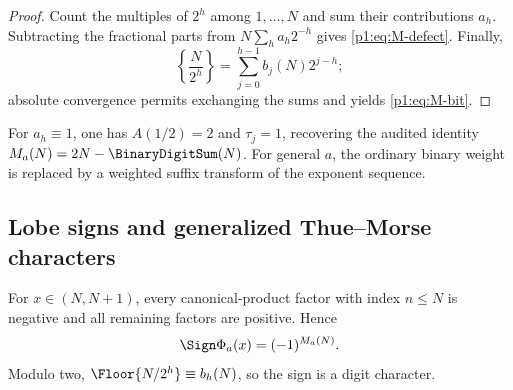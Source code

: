 \documentclass[11pt,oneside]{article}
\numberwithin{equation}{section}
\theoremstyle{definition}
\theoremstyle{remark}
\begin{document}
\begin{proof}
Count the multiples of $2^h$ among $1,\ldots,N$ and sum their contributions $a_h$.
Subtracting the fractional parts from $N\sum_ha_h2^{-h}$ gives \eqref{p1:eq:M-defect}.
Finally,
\[
 \left\{\frac{N}{2^h}\right\}
 =\sum_{j=0}^{h-1}b_j(N)2^{j-h};
\]
absolute convergence permits exchanging the sums and yields \eqref{p1:eq:M-bit}.
\end{proof}

For $a_h\equiv1$, one has $A(1/2)=2$ and $\tau_j=1$, recovering the audited identity
$M_a(N)=2N-\BinaryDigitSum(N)$.  For general $a$, the ordinary binary weight is replaced by a weighted
suffix transform of the exponent sequence.

\subsection{Lobe signs and generalized Thue--Morse characters}

For $x\in(N,N+1)$, every canonical-product factor with index $n\le N$ is negative and all
remaining factors are positive.  Hence
\begin{equation}
 \Sign\Phi_a(x)=(-1)^{M_a(N)}.
 \label{p1:eq:lobe-sign-count}
\end{equation}
Modulo two,
$\Floor{N/2^h}\equiv b_h(N)$, so the sign is a digit character.
\end{document}
